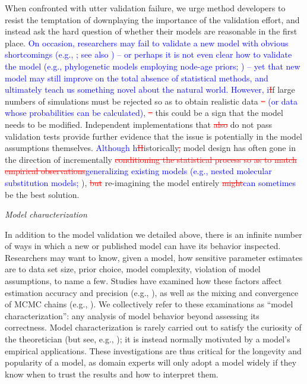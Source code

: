 \documentclass[oneside]{article}
\begin{document}
When confronted with utter validation failure, we urge method developers to resist the temptation of downplaying the importance of the validation effort, and instead ask the hard question of whether their models are reasonable in the first place.
\textcolor{blue}{On occasion, researchers may fail to validate a new model with obvious shortcomings (e.g., }\citealp{ree08}\textcolor{blue}{; see also }\citealp{ree09,goldberg11,matzke22}\textcolor{blue}{) -- or perhaps it is not even clear how to validate the model (e.g., phylogenetic models employing node-age priors; \citealp{ho09}) -- yet that new model may still improve on the total absence of statistical methods, and ultimately teach us something novel about the natural world.}
\textcolor{blue}{However, i}\textcolor{red}{\st{I}}f large numbers of simulations must be rejected so as to obtain realistic data\textcolor{red}{\st{ -- }}\textcolor{blue}{(or data whose probabilities can be calculated), }\textcolor{red}{\st{ -- }}this could be a sign that the model needs to be modified. 
Independent implementations that \textcolor{red}{\st{also }}do not pass validation tests provide further evidence that the issue is potentially in the model assumptions themselves.
\textcolor{blue}{Although h}\textcolor{red}{\st{H}}istorically\textcolor{red}{\st{,}} model design has often gone in the direction of incrementally\textcolor{red}{\st{ conditioning the statistical process so as to match empirical observations}}\textcolor{blue}{generalizing existing models (e.g., nested molecular substitution models; }\citealp{fel04}), \textcolor{red}{\st{but }}re-imagining the model entirely \textcolor{red}{\st{might}}\textcolor{blue}{can sometimes} be the best solution.

\vspace{.25cm}

\noindent \emph{Model characterization}

In addition to the model validation we detailed above, there is an infinite number of ways in which a new or published model can have its behavior inspected.
Researchers may want to know, given a model, how sensitive parameter estimates are to data set size, prior choice, model complexity, violation of model assumptions, to name a few.
Studies have examined how these factors affect estimation accuracy and precision (e.g., \citealp{zhang23,luo23}), as well as the mixing and convergence of MCMC chains (e.g., \citealp{nylander04,zhang23}).
We collectively refer to these examinations as ``model characterization'': any analysis of model behavior beyond assessing its correctness.
Model characterization is rarely carried out to satisfy the curiosity of the theoretician (but see, e.g., \citealp{tuffley97,steel20}); it is instead normally motivated by a model's empirical applications.
These investigations are thus critical for the longevity and popularity of a model, as domain experts will only adopt a model widely if they know when to trust the results and how to interpret them.
\end{document}
